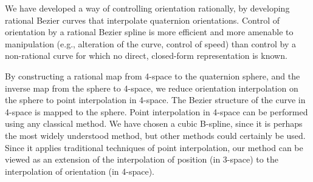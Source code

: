 We have developed a way of controlling orientation rationally,
by developing rational Bezier curves that interpolate quaternion orientations.
Control of orientation by a rational Bezier spline is more efficient
and more amenable to manipulation (e.g., alteration of the curve, control
of speed) than control by a non-rational curve 
for which no direct, closed-form representation is known.

By constructing a rational map from 4-space to the quaternion sphere,
and the inverse map from the sphere to 4-space,
we reduce orientation interpolation on the sphere 
to point interpolation in 4-space.
The Bezier structure of the curve in 4-space is mapped to the sphere.
Point interpolation in 4-space can be performed using any
classical method.
We have chosen a cubic B-spline,
since it is perhaps the most widely understood method,
but other methods could certainly be used.
Since it applies traditional techniques of point interpolation,
our method can be viewed as an extension of the interpolation of position
(in 3-space) to the interpolation of orientation (in 4-space).





